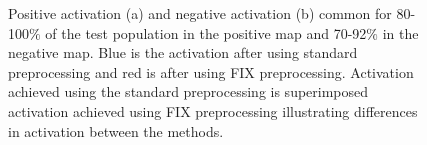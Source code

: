 \begin{figure}[H]%
	\centering
	\qquad
	\caption{Positive activation (a) and negative activation (b) common for 80-100$\percent$ of the test population in the positive map and 70-92$\percent$ in the negative map. Blue is the activation after using standard preprocessing and red is after using FIX preprocessing. Activation achieved using the standard preprocessing is superimposed activation achieved using FIX preprocessing illustrating differences in activation between the methods.}
	\label{fig:70}
\end{figure}


